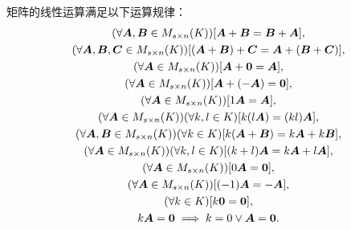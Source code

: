 \begin{theorem}
矩阵的线性运算满足以下运算规律：
\begin{gather}
	(\forall\boldsymbol{A},\boldsymbol{B}\in M_{s\times n}(K))[\boldsymbol{A} + \boldsymbol{B} = \boldsymbol{B} + \boldsymbol{A}], \\
	(\forall\boldsymbol{A},\boldsymbol{B},\boldsymbol{C}\in M_{s\times n}(K))[(\boldsymbol{A} + \boldsymbol{B}) + \boldsymbol{C} = \boldsymbol{A} + (\boldsymbol{B} + \boldsymbol{C})], \\
	(\forall\boldsymbol{A}\in M_{s\times n}(K))[\boldsymbol{A} + \boldsymbol0 = \boldsymbol{A}], \\
	(\forall\boldsymbol{A}\in M_{s\times n}(K))[\boldsymbol{A} + (-\boldsymbol{A}) = \boldsymbol0], \\
	(\forall\boldsymbol{A}\in M_{s\times n}(K))[1 \boldsymbol{A} = \boldsymbol{A}], \\
	(\forall\boldsymbol{A}\in M_{s\times n}(K))(\forall k,l\in K)[k(l \boldsymbol{A}) = (kl) \boldsymbol{A}], \\
	(\forall\boldsymbol{A},\boldsymbol{B}\in M_{s\times n}(K))(\forall k\in K)[k(\boldsymbol{A} + \boldsymbol{B}) = k\boldsymbol{A} + k\boldsymbol{B}], \\
	(\forall\boldsymbol{A}\in M_{s\times n}(K))(\forall k,l\in K)[(k+l)\boldsymbol{A} = k\boldsymbol{A} + l\boldsymbol{A}], \\
	(\forall\boldsymbol{A}\in M_{s\times n}(K))[0\boldsymbol{A} = \boldsymbol0], \\
	(\forall\boldsymbol{A}\in M_{s\times n}(K))[(-1)\boldsymbol{A} = -\boldsymbol{A}], \\
	(\forall k\in K)[k\boldsymbol0 = \boldsymbol0], \\
	k\boldsymbol{A} = \boldsymbol0 \implies k = 0 \lor \boldsymbol{A} = \boldsymbol0.
\end{gather}
\end{theorem}
